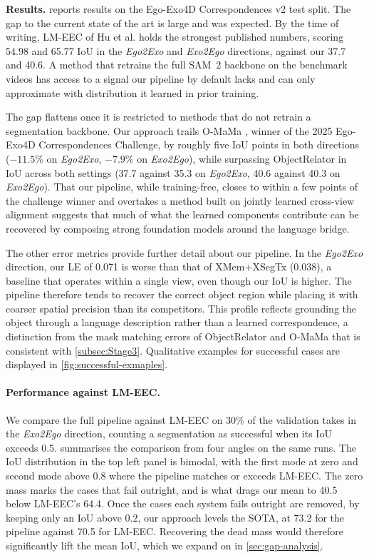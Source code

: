 \textbf{Results.}  reports results on the Ego-Exo4D Correspondences v2 test split. The gap to the current state of the art is large and was expected. By the time of writing, LM-EEC of Hu et al. \cite{hu2025lmeec} holds the strongest published numbers, scoring 54.98 and 65.77 IoU in the \textit{Ego2Exo} and \textit{Exo2Ego} directions, against our 37.7 and 40.6. A method that retrains the full SAM~2 backbone on the benchmark videos has access to a signal our pipeline by default lacks and can only approximate with distribution it learned in prior training. 

The gap flattens once it is restricted to methods that do not retrain a segmentation backbone. Our approach trails O-MaMa \cite{o-mama}, winner of the 2025 Ego-Exo4D Correspondences Challenge, by roughly five IoU points in both directions ($-11.5\%$ on \textit{Ego2Exo}, $-7.9\%$ on \textit{Exo2Ego}), while surpassing ObjectRelator \cite{fu2025objectrelator} in IoU across both settings (37.7 against 35.3 on \textit{Ego2Exo}, 40.6 against 40.3 on \textit{Exo2Ego}). That our pipeline, while training-free, closes to within a few points of the challenge winner and overtakes a method built on jointly learned cross-view alignment suggests that much of what the learned components contribute can be recovered by composing strong foundation models around the language bridge.

The other error metrics provide further detail about our pipeline. In the \textit{Ego2Exo} direction, our LE of 0.071 is worse than that of XMem+XSegTx (0.038), a baseline that operates within a single view, even though our IoU is higher. The pipeline therefore tends to recover the correct object region while placing it with coarser spatial precision than its competitors. This profile reflects grounding the object through a language description rather than a learned correspondence, a distinction from the mask matching errors of ObjectRelator and O-MaMa that is consistent with \cref{subsec:Stage3}. Qualitative examples for successful cases are displayed in \cref{fig:successful-exmaples}.

\paragraph{Performance against LM-EEC.} We compare the full pipeline against LM-EEC \cite{hu2025lmeec} on 30\% of the validation takes in the \textit{Exo2Ego} direction, counting a segmentation as successful when its IoU exceeds 0.5.  summarises the comparison from four angles on the same runs. The IoU distribution in the top left panel is bimodal, with the first mode at zero and second mode above 0.8 where the pipeline matches or exceeds LM-EEC. The zero mass marks the cases that fail outright, and is what drags our mean to 40.5 below LM-EEC's 64.4. Once the cases each system fails outright are removed, by keeping only an IoU above 0.2, our approach levels the SOTA, at 73.2 for the pipeline against 70.5 for LM-EEC. Recovering the dead mass would therefore significantly lift the mean IoU, which we expand on in \cref{sec:gap-analysis}.

